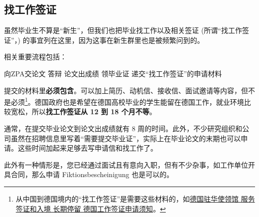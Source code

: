   \subsection{找工作签证}

    虽然毕业生不算是``新生''，但我们也把毕业找工作以及相关签证 (所谓``找工作签证''，) 的事宜列在这里，因为这事在新生群里也是被频繁问到的。

    相关重要流程包括：
    \begin{center}
      向ZPA交论文 \MVRightarrow{} 答辩 \MVRightarrow{} 论文出成绩 \MVRightarrow{} 领毕业证 \MVRightarrow{} 递交``找工作签证''的申请材料
    \end{center}
    提交的材料里\textbf{必须包含}。可以加上简历、动机信、接收信、面试邀请等内容，但不是必须\footnote{从中国到德国境内的``找工作签证''是需要这些材料的，如\href{https://china.diplo.de/blob/1341662/3467e6cb74888d4cb9d8e188c4f4308b/pdf-merkblatt-natvisum-arbeitsaufnahme-data.pdf}{德国驻华使领馆 \MVRightarrow{} 服务 \MVRightarrow{} 签证和入境 \MVRightarrow{} 长期停留 \MVRightarrow{} 德国工作签证申请须知}。}。德国政府也是希望在德国高校毕业的学生能留在德国工作，就业环境比较宽松，所以\textbf{找工作签证从 12 到 18 个月不等}。

    通常，在提交毕业论文到论文出成绩就有 8 周的时间。此外，不少研究组织和公司虽然在招聘信息里写着``需要提交毕业证''，实际上在毕业论文的末期也可以申请。这些时间加起来足够去写申请信和找工作了。

    此外有一种情形是，您已经通过面试且有意向入职，但有不少杂事，如工作单位开具合同，那么申请 Fiktionsbescheinigung 也是可以的。
